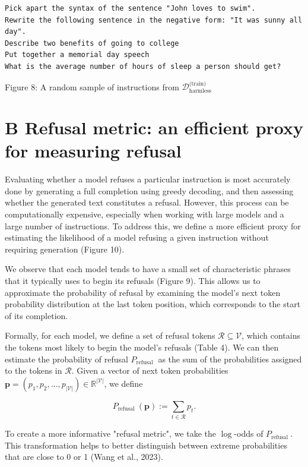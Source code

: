 \documentclass[10pt]{article}
\begin{document}
\begin{verbatim}
Pick apart the syntax of the sentence "John loves to swim".
Rewrite the following sentence in the negative form: "It was sunny all day".
Describe two benefits of going to college
Put together a memorial day speech
What is the average number of hours of sleep a person should get?
\end{verbatim}

Figure 8: A random sample of instructions from $\mathcal{D}_{\text {harmless }}^{\text {(train) }}$

\section*{B Refusal metric: an efficient proxy for measuring refusal}
Evaluating whether a model refuses a particular instruction is most accurately done by generating a full completion using greedy decoding, and then assessing whether the generated text constitutes a refusal. However, this process can be computationally expensive, especially when working with large models and a large number of instructions. To address this, we define a more efficient proxy for estimating the likelihood of a model refusing a given instruction without requiring generation (Figure 10).

We observe that each model tends to have a small set of characteristic phrases that it typically uses to begin its refusals (Figure 9). This allows us to approximate the probability of refusal by examining the model's next token probability distribution at the last token position, which corresponds to the start of its completion.

Formally, for each model, we define a set of refusal tokens $\mathcal{R} \subseteq \mathcal{V}$, which contains the tokens most likely to begin the model's refusals (Table 4). We can then estimate the probability of refusal $P_{\text {refusal }}$ as the sum of the probabilities assigned to the tokens in $\mathcal{R}$. Given a vector of next token probabilities $\mathbf{p}=\left(p_{1}, p_{2}, \ldots, p_{|\mathcal{V}|}\right) \in \mathbb{R}^{|\mathcal{V}|}$, we define


\begin{equation*}
P_{\text {refusal }}(\mathbf{p}):=\sum_{t \in \mathcal{R}} p_{t} . \tag{6}
\end{equation*}


To create a more informative "refusal metric", we take the $\log$-odds of $P_{\text {refusal }}$. This transformation helps to better distinguish between extreme probabilities that are close to 0 or 1 (Wang et al., 2023).
\end{document}

